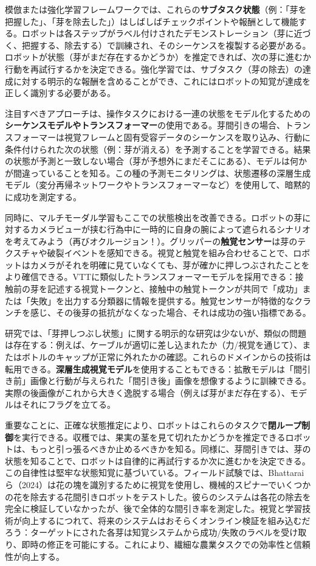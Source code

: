 \documentclass[a4paper,fleqn,10pt,twocolumn]{template_v1.0}
\begin{document}
模倣または強化学習フレームワークでは、これらの\textbf{サブタスク状態}（例：「芽を把握した」、「芽を除去した」）はしばしばチェックポイントや報酬として機能する。ロボットは各ステップがラベル付けされたデモンストレーション（芽に近づく、把握する、除去する）で訓練され、そのシーケンスを複製する必要がある。ロボットが状態（芽がまだ存在するかどうか）を推定できれば、次の芽に進むか行動を再試行するかを決定できる。強化学習では、サブタスク（芽の除去）の達成に対する明示的な報酬を含めることができ、これにはロボットの知覚が達成を正しく識別する必要がある。

注目すべきアプローチは、操作タスクにおける一連の状態をモデル化するための\textbf{シーケンスモデルやトランスフォーマー}の使用である。芽間引きの場合、トランスフォーマーは視覚フレームと固有受容データのシーケンスを取り込み、行動に条件付けられた次の状態（例：芽が消える）を予測することを学習できる。結果の状態が予測と一致しない場合（芽が予想外にまだそこにある）、モデルは何かが間違っていることを知る。この種の予測モニタリングは、状態遷移の深層生成モデル（変分再帰ネットワークやトランスフォーマーなど）を使用して、暗黙的に成功を測定する。

同時に、マルチモーダル学習もここでの状態検出を改善できる。ロボットの芽に対するカメラビューが挟む行為中に一時的に自身の腕によって遮られるシナリオを考えてみよう（再びオクルージョン！）。グリッパーの\textbf{触覚センサー}は芽のテクスチャや破裂イベントを感知できる。視覚と触覚を組み合わせることで、ロボットはカメラがそれを明確に見ていなくても、芽が確かに押しつぶされたことをより確信できる。VTTに類似したトランスフォーマーモデルを採用できる：接触前の芽を記述する視覚トークンと、接触中の触覚トークンが共同で「成功」または「失敗」を出力する分類器に情報を提供する。触覚センサーが特徴的なクランチを感じ、その後芽の抵抗がなくなった場合、それは成功の強い指標である。

研究では、「芽押しつぶし状態」に関する明示的な研究は少ないが、類似の問題は存在する：例えば、ケーブルが適切に差し込まれたか（力/視覚を通じて）、またはボトルのキャップが正常に外れたかの確認。これらのドメインからの技術は転用できる。\textbf{深層生成視覚モデル}を使用することもできる：拡散モデルは「間引き前」画像と行動が与えられた「間引き後」画像を想像するように訓練できる。実際の後画像がこれから大きく逸脱する場合（例えば芽がまだ存在する）、モデルはそれにフラグを立てる。

重要なことに、正確な状態推定により、ロボットはこれらのタスクで\textbf{閉ループ制御}を実行できる。収穫では、果実の茎を見て切れたかどうかを推定できるロボットは、もっと引っ張るべきか止めるべきかを知る。同様に、芽間引きでは、芽の状態を知ることで、ロボットは自律的に再試行するか次に進むかを決定できる。この自律性は堅牢な状態知覚に基づいている。フィールド試験では、Bhattaraiら（2024）は花の塊を識別するために視覚を使用し、機械的スピナーでいくつかの花を除去する花間引きロボットをテストした\cite{Bhattarai2024, Bhattarai2024a}。彼らのシステムは各花の除去を完全に検証していなかったが、後で全体的な間引き率を測定した。視覚と学習技術が向上するにつれて、将来のシステムはおそらくオンライン検証を組み込むだろう：ターゲットにされた各芽は知覚システムから成功/失敗のラベルを受け取り、即時の修正を可能にする。これにより、繊細な農業タスクでの効率性と信頼性が向上する。
\end{document}
